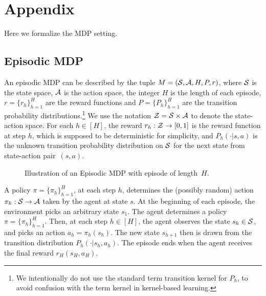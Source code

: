 \documentclass{article}
\begin{document}
\section*{Appendix}

Here we formalize the MDP setting.
\subsection*{Episodic MDP}
An episodic MDP can be described by the tuple $M=(\mathcal{S},\mathcal{A}, H, P, r)$, where $\mathcal{S}$ is the state space, $\mathcal{A}$ is the action space, the integer $H$ is the length of each episode, $r=\{r_h\}_{h=1}^H$ are the reward functions and $P=\{P_h\}_{h=1}^H$ are the transition probability distributions.\footnote{We intentionally do not use the standard term transition kernel for $P_h$, to avoid confusion with the term kernel in kernel-based learning.}
We use the notation $\mathcal{Z}=\mathcal{S}\times\mathcal{A}$ to denote the state-action space. For each $h\in[H]$, the reward $r_h: \mathcal{Z}\rightarrow [0,1]$ is the reward function at step $h$, which is supposed to be deterministic for simplicity, and $P_h(\cdot|s,a)$ is the unknown transition probability distribution on $\mathcal{S}$ for the next state from state-action pair~$(s,a)$.


\begin{figure}[ht]
    \centering
    \caption{Illustration of an Episodic MDP with episode of length~$H$.}
    \label{fig:episodic_mdp}
\end{figure}

A policy $\pi=\{\pi_h\}_{h=1}^H$, at each step $h$, determines the (possibly random) action $\pi_h:\mathcal{S}\rightarrow \mathcal{A}$ taken by the agent at state $s$.  
At the beginning of each episode, the environment picks an arbitrary state $s_1$. The agent determines a policy $\pi=\{\pi_h\}_{h=1}^H$. Then, at each step $h\in[H]$, the agent observes the state $s_h\in\mathcal{S}$, and picks an action $a_h=\pi_h(s_h)$. The new state $s_{h+1}$ then is drawn from the transition distribution $P_h(\cdot|s_h, a_h)$. The episode ends when the agent receives the final reward $r_H(s_H,a_H)$.  
\end{document}
